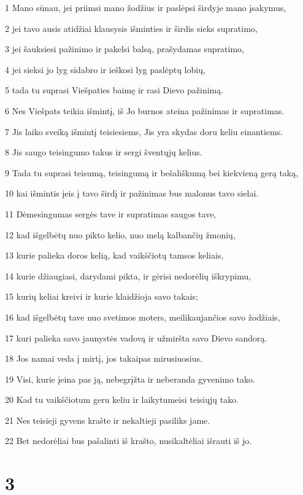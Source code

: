 \par 1 Mano sūnau, jei priimsi mano žodžius ir paslėpsi širdyje mano įsakymus, 
\par 2 jei tavo ausis atidžiai klausysis išminties ir širdis sieks supratimo, 
\par 3 jei šauksiesi pažinimo ir pakelsi balsą, prašydamas supratimo, 
\par 4 jei sieksi jo lyg sidabro ir ieškosi lyg paslėptų lobių, 
\par 5 tada tu suprasi Viešpaties baimę ir rasi Dievo pažinimą. 
\par 6 Nes Viešpats teikia išmintį, iš Jo burnos ateina pažinimas ir supratimas. 
\par 7 Jis laiko sveiką išmintį teisiesiems, Jis yra skydas doru keliu einantiems. 
\par 8 Jis saugo teisingumo takus ir sergi šventųjų kelius. 
\par 9 Tada tu suprasi teisumą, teisingumą ir bešališkumą bei kiekvieną gerą taką, 
\par 10 kai išmintis įeis į tavo širdį ir pažinimas bus malonus tavo sielai. 
\par 11 Dėmesingumas sergės tave ir supratimas saugos tave, 
\par 12 kad išgelbėtų nuo pikto kelio, nuo melą kalbančių žmonių, 
\par 13 kurie palieka doros kelią, kad vaikščiotų tamsos keliais, 
\par 14 kurie džiaugiasi, darydami pikta, ir gėrisi nedorėlių iškrypimu, 
\par 15 kurių keliai kreivi ir kurie klaidžioja savo takais; 
\par 16 kad išgelbėtų tave nuo svetimos moters, meilikaujančios savo žodžiais, 
\par 17 kuri palieka savo jaunystės vadovą ir užmiršta savo Dievo sandorą. 
\par 18 Jos namai veda į mirtį, jos takai­pas mirusiuosius. 
\par 19 Visi, kurie įeina pas ją, nebegrįžta ir neberanda gyvenimo tako. 
\par 20 Kad tu vaikščiotum geru keliu ir laikytumeisi teisiųjų tako. 
\par 21 Nes teisieji gyvens krašte ir nekaltieji pasiliks jame. 
\par 22 Bet nedorėliai bus pašalinti iš krašto, nusikaltėliai išrauti iš jo.



\chapter{3}


